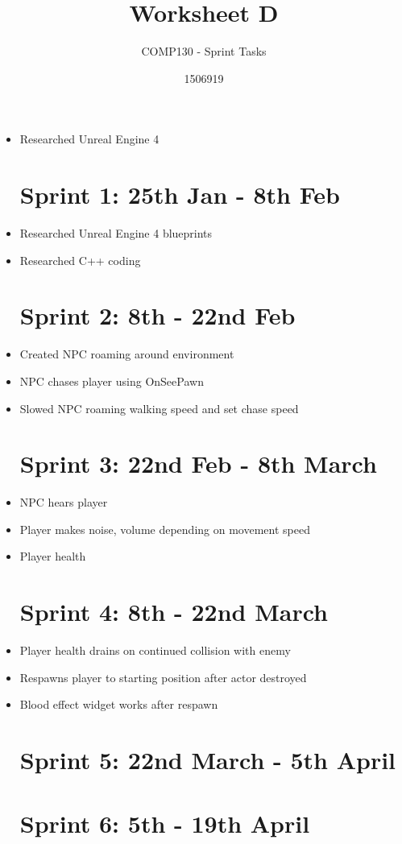 \documentclass{scrartcl}
\title{Worksheet D}
\subtitle{COMP130 - Sprint Tasks}
\author{1506919}
\begin{document}
\maketitle

\begin{itemize}

\section*{Sprint 0: Christmas break}

\item Researched Unreal Engine 4

\section*{Sprint 1: 25th Jan - 8th Feb}

\item Researched Unreal Engine 4 blueprints
\item Researched C++ coding

\section*{Sprint 2: 8th - 22nd Feb}

\item Created NPC roaming around environment
\item NPC chases player using OnSeePawn
\item Slowed NPC roaming walking speed and set chase speed

\section*{Sprint 3: 22nd Feb - 8th March}

\item NPC hears player
\item Player makes noise, volume depending on movement speed
\item Player health

\section*{Sprint 4: 8th - 22nd March}

\item Player health drains on continued collision with enemy
\item Respawns player to starting position after actor destroyed
\item Blood effect widget works after respawn

\section*{Sprint 5: 22nd March - 5th April}

\section*{Sprint 6: 5th - 19th April}



\end{itemize}
\end{document}
